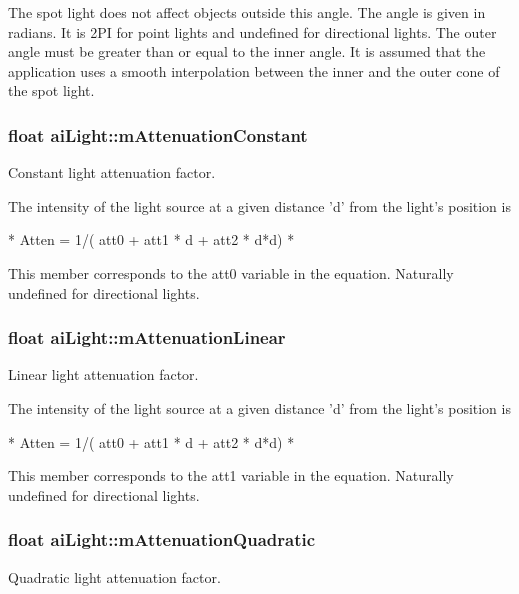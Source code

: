 The spot light does not affect objects outside this angle. The angle is given in radians. It is 2\-P\-I for point lights and undefined for directional lights. The outer angle must be greater than or equal to the inner angle. It is assumed that the application uses a smooth interpolation between the inner and the outer cone of the spot light. \hypertarget{structai_light_ae8804b3c309527ca0f85d676bab55710}{
\subsubsection[{m\-Attenuation\-Constant}]{\setlength{\rightskip}{0pt plus 5cm}float ai\-Light\-::m\-Attenuation\-Constant}}\label{structai_light_ae8804b3c309527ca0f85d676bab55710}
Constant light attenuation factor.

The intensity of the light source at a given distance 'd' from the light's position is 
\begin{DoxyCode}
*  Atten = 1/( att0 + att1 * d + att2 * d*d)
*  
\end{DoxyCode}
 This member corresponds to the att0 variable in the equation. Naturally undefined for directional lights. \hypertarget{structai_light_aefda311eaa785ea345782dfa95be817c}{
\subsubsection[{m\-Attenuation\-Linear}]{\setlength{\rightskip}{0pt plus 5cm}float ai\-Light\-::m\-Attenuation\-Linear}}\label{structai_light_aefda311eaa785ea345782dfa95be817c}
Linear light attenuation factor.

The intensity of the light source at a given distance 'd' from the light's position is 
\begin{DoxyCode}
*  Atten = 1/( att0 + att1 * d + att2 * d*d)
*  
\end{DoxyCode}
 This member corresponds to the att1 variable in the equation. Naturally undefined for directional lights. \hypertarget{structai_light_ab4fb07bfa40a807661b1ed1791838a6d}{
\subsubsection[{m\-Attenuation\-Quadratic}]{\setlength{\rightskip}{0pt plus 5cm}float ai\-Light\-::m\-Attenuation\-Quadratic}}\label{structai_light_ab4fb07bfa40a807661b1ed1791838a6d}
Quadratic light attenuation factor.

